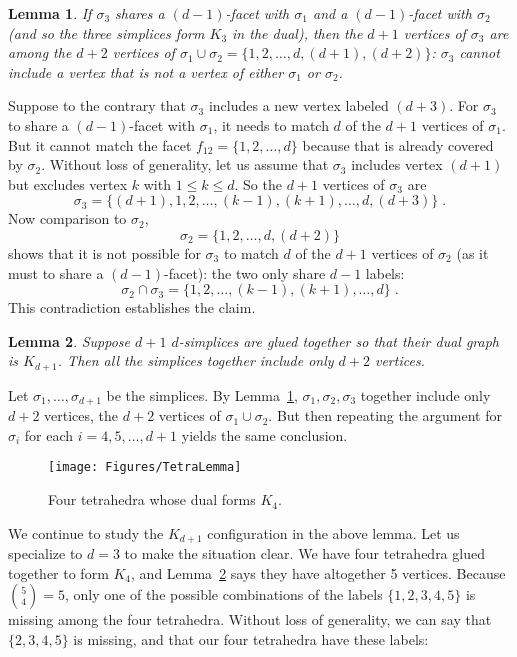 \pdfoutput=1  \documentclass[]{article}
\newcommand{\ABox}{
\raisebox{3pt}{\framebox[6pt]{\rule{6pt}{0pt}}}
}
\newenvironment{proof}{{\bf Proof:}}{\hfill\ABox}
\newtheorem{lemma}{Lemma}
\newcommand{\lemlab}[1]{\label{lemma:#1}}
\newcommand{\figlab}[1]{\label{fig:#1}}
\newcommand{\lemref}[1]{\ref{lemma:#1}}
\def\s{{\sigma}}
\begin{document}
\begin{lemma}
If $\s_3$ shares a $(d{-}1)$-facet with $\s_1$ and 
a $(d{-}1)$-facet
with $\s_2$ (and so the three simplices form $K_3$ in the dual),
then the $d+1$ vertices of $\s_3$ are among the $d+2$ vertices
of $\s_1 \cup \s_2 = \{ 1,2,\ldots,d,(d{+}1),(d{+}2) \}$:
$\s_3$ cannot include a vertex that is not a vertex of 
either $\s_1$ or $\s_2$.
\lemlab{K3.d2}
\end{lemma}
\begin{proof}
Suppose to the contrary that $\s_3$ includes a new vertex labeled $(d{+}3)$.
For $\s_3$ to share a $(d{-}1)$-facet with $\s_1$,
it needs to match $d$ of the $d+1$ vertices of $\s_1$.
But it cannot match the facet $f_{12} =\{ 1,2,\ldots,d \}$ because
that is already covered by $\s_2$.
Without loss of generality, let us assume that $\s_3$ includes
vertex $(d{+}1)$ but excludes vertex $k$ with $1 \le k \le d$.
So the $d+1$ vertices of $\s_3$ are
$$\s_3 = \{ (d{+}1), 1,2,\ldots,(k{-}1),(k{+}1),\ldots,d,(d{+}3)\} \;.$$
Now comparison to $\s_2$,
$$\s_2= \{ 1,2,\ldots,d,(d{+}2) \} $$
shows that it is not possible for $\s_3$ to match $d$ of the $d+1$
vertices of $\s_2$ (as it must to share a $(d{-}1)$-facet):
the two only share $d-1$ labels: 
$$\s_2 \cap \s_3 = \{1,2,\ldots,(k{-}1),(k{+}1),\ldots,d \}\;.$$
This contradiction establishes the claim.
\end{proof}

\begin{lemma}
Suppose $d+1$ $d$-simplices are glued together so that their dual
graph is $K_{d+1}$.
Then all the simplices together include only $d+2$ vertices.
\lemlab{Kd1.d2}
\end{lemma}
\begin{proof}
Let $\s_1,\ldots,\s_{d+1}$ be the simplices. 
By Lemma~\lemref{K3.d2}, $\s_1,\s_2,\s_3$ together include only $d+2$
vertices,
the $d+2$ vertices of $\s_1 \cup \s_2$.
But then repeating the argument for $\s_i$ for each $i=4,5,\ldots,d+1$
yields the same conclusion.
\end{proof}

\begin{figure}[htbp]
\centering
\texttt{[image: Figures/TetraLemma]}
\caption{Four tetrahedra whose dual forms $K_4$.}
\figlab{TetraLemma}
\end{figure}



We continue to study the $K_{d+1}$ configuration in the above
lemma.  Let us specialize to $d=3$ to make the situation clear.
We have four tetrahedra glued together to form $K_4$,
and Lemma~\lemref{Kd1.d2} says they have altogether 5 vertices.
Because $\binom{5}{4}=5$, only one of the possible combinations
of the labels $\{1,2,3,4,5\}$ is missing among the four tetrahedra.
Without loss of generality, we can say that $\{2,3,4,5\}$ is missing,
and that our four tetrahedra have these labels:
\end{document}
